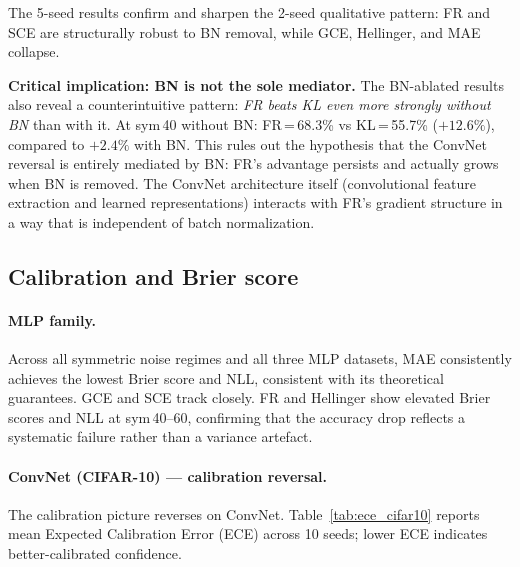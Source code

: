 \documentclass[11pt]{article}
\begin{document}
The 5-seed results confirm and sharpen the 2-seed qualitative pattern: FR and SCE are
structurally robust to BN removal, while GCE, Hellinger, and MAE collapse.

\textbf{Critical implication: BN is not the sole mediator.}
The BN-ablated results also reveal a counterintuitive pattern: \emph{FR beats KL even more
strongly without BN} than with it.
At sym\,40 without BN: FR\,=\,68.3\% vs KL\,=\,55.7\% ($+12.6\%$), compared to
$+2.4\%$ with BN.
This rules out the hypothesis that the ConvNet reversal is entirely mediated by BN:
FR's advantage persists and actually grows when BN is removed.
The ConvNet architecture itself (convolutional feature extraction and learned
representations) interacts with FR's gradient structure in a way that is
independent of batch normalization.

\subsection{Calibration and Brier score}

\paragraph{MLP family.}
Across all symmetric noise regimes and all three MLP datasets, MAE consistently
achieves the lowest Brier score and NLL, consistent with its theoretical
guarantees.
GCE and SCE track closely.
FR and Hellinger show elevated Brier scores and NLL at sym\,40--60, confirming
that the accuracy drop reflects a systematic failure rather than a variance
artefact.

\paragraph{ConvNet (CIFAR-10) — calibration reversal.}
The calibration picture reverses on ConvNet.
Table~\ref{tab:ece_cifar10} reports mean Expected Calibration Error (ECE) across 10 seeds;
lower ECE indicates better-calibrated confidence.
\end{document}
